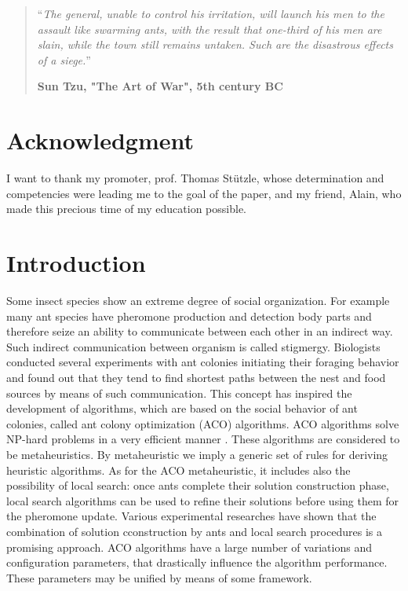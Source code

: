\documentclass[12pt,a4paper,oneside]{book}
\begin{document}
\medskip

\begin{quotation}
\noindent ``\emph{The general, unable to control his irritation, will launch his men
to the assault like swarming ants, with the result that one-third of
his men are slain, while the town still remains untaken. Such are
the disastrous effects of a siege.}''
\begin{flushright}\textbf{Sun Tzu, "The Art of War", 5th century BC}\end{flushright}
\end{quotation}
\chapter*{Acknowledgment}
\thispagestyle{empty} 

\noindent I want to thank my promoter, prof. Thomas St{\"u}tzle, whose determination and competencies were leading me to the goal of the paper, and my friend, Alain, who made this precious time of my education possible.

\thispagestyle{empty} 
\setcounter{page}{0}
\tableofcontents
\mainmatter 
\chapter{Introduction}
\setcounter{page}{1}
\vspace*{0.5cm}

Some insect species show an extreme degree of social organization. For example many ant species have pheromone production and detection body parts and therefore seize an ability to communicate between each other in an indirect way. Such indirect communication between organism is called stigmergy. Biologists conducted several experiments with ant colonies initiating their foraging behavior and found out that they tend to find shortest paths between the nest and food sources by means of such communication. This concept has inspired the development of algorithms, which are based on the social behavior of ant colonies, called ant colony optimization (ACO) algorithms. ACO algorithms solve NP-hard problems in a very efficient manner \cite{Dorigo1996}. These algorithms are considered to be metaheuristics. By metaheuristic we imply a generic set of rules for deriving heuristic algorithms. As for the ACO metaheuristic, it includes also the possibility of local search: once ants complete their solution construction phase, local search algorithms can be used to refine their solutions before using them for the pheromone update. Various experimental researches have shown that the combination of solution cconstruction by ants and local search procedures is a promising approach. ACO algorithms have a large number of variations and configuration parameters, that drastically influence the algorithm performance. These parameters may be unified by means of some framework.
\end{document}
